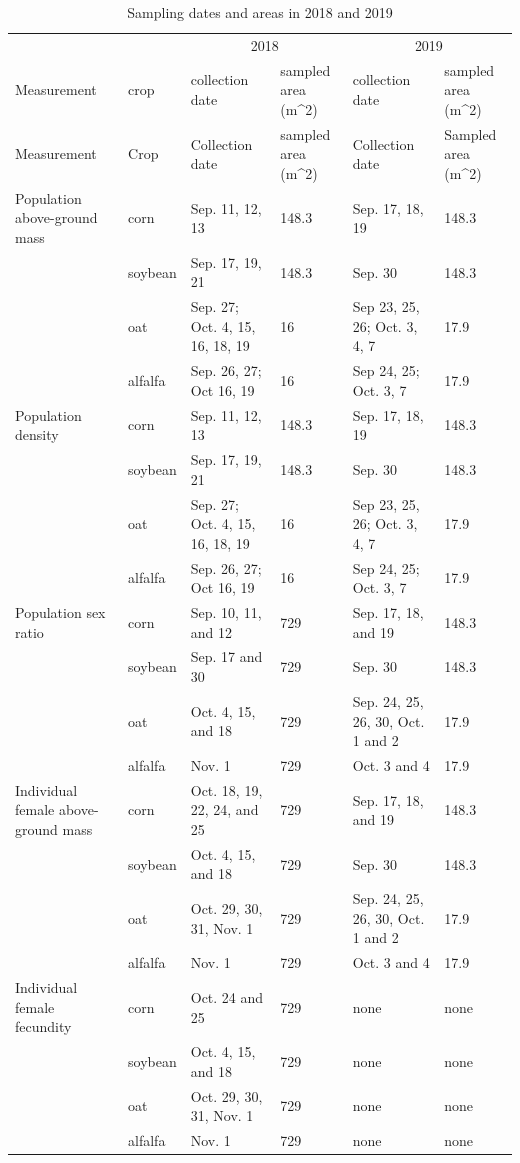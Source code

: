 \documentclass[
]{article}
\begin{document}
\begin{landscape}\begin{table}

\caption{\label{tab:sample-id}Sampling dates and areas in 2018 and 2019}
\centering
\fontsize{8}{10}\selectfont
\begin{tabular}[t]{llllll}
\toprule
\multicolumn{2}{c}{ } & \multicolumn{2}{c}{2018} & \multicolumn{2}{c}{2019} \\
\cmidrule(l{3pt}r{3pt}){3-4} \cmidrule(l{3pt}r{3pt}){5-6}
Measurement & crop & collection date & sampled area (m\textasciicircum{}2) & collection date & sampled area (m\textasciicircum{}2)\\
\midrule
Measurement & Crop & Collection date & sampled area (m\textasciicircum{}2) & Collection date & Sampled area (m\textasciicircum{}2)\\
Population above-ground mass & corn & Sep. 11, 12, 13 & 148.3 & Sep. 17, 18, 19 & 148.3\\
 & soybean & Sep. 17, 19, 21 & 148.3 & Sep. 30 & 148.3\\
 & oat & Sep. 27; Oct. 4, 15, 16, 18, 19 & 16 & Sep 23, 25, 26; Oct. 3, 4, 7 & 17.9\\
 & alfalfa & Sep. 26, 27; Oct 16, 19 & 16 & Sep 24, 25; Oct. 3, 7 & 17.9\\
Population density & corn & Sep. 11, 12, 13 & 148.3 & Sep. 17, 18, 19 & 148.3\\
 & soybean & Sep. 17, 19, 21 & 148.3 & Sep. 30 & 148.3\\
 & oat & Sep. 27; Oct. 4, 15, 16, 18, 19 & 16 & Sep 23, 25, 26; Oct. 3, 4, 7 & 17.9\\
 & alfalfa & Sep. 26, 27; Oct 16, 19 & 16 & Sep 24, 25; Oct. 3, 7 & 17.9\\
Population sex ratio & corn & Sep. 10, 11, and 12 & 729 & Sep. 17, 18, and 19 & 148.3\\
 & soybean & Sep. 17 and 30 & 729 & Sep. 30 & 148.3\\
 & oat & Oct. 4, 15, and 18 & 729 & Sep. 24, 25, 26, 30, Oct. 1 and 2 & 17.9\\
 & alfalfa & Nov. 1 & 729 & Oct. 3 and 4 & 17.9\\
Individual female above-ground mass & corn & Oct. 18, 19, 22,  24, and 25 & 729 & Sep. 17, 18, and 19 & 148.3\\
 & soybean & Oct. 4, 15, and 18 & 729 & Sep. 30 & 148.3\\
 & oat & Oct. 29, 30, 31, Nov. 1 & 729 & Sep. 24, 25, 26, 30, Oct. 1 and 2 & 17.9\\
 & alfalfa & Nov. 1 & 729 & Oct. 3 and 4 & 17.9\\
Individual female fecundity & corn & Oct. 24 and 25 & 729 & none & none\\
 & soybean & Oct. 4, 15, and 18 & 729 & none & none\\
 & oat & Oct. 29, 30, 31, Nov. 1 & 729 & none & none\\
 & alfalfa & Nov. 1 & 729 & none & none\\
\bottomrule
\end{tabular}
\end{table}
\end{landscape}
\end{document}
